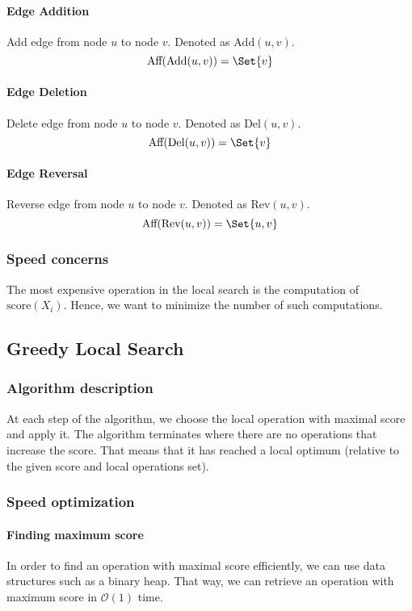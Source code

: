 \documentclass{article}
\newcommand{\score}[1]{
	\textrm{score}(#1)
}
\newcommand{\affnodes}[1]{
	\textrm{Aff}(#1)	
}
\newcommand{\addedge}[1]{
	\textrm{Add}(#1)	
}
\newcommand{\rmedge}[1]{
	\textrm{Del}(#1)
}
\newcommand{\revedge}[1]{
	\textrm{Rev}(#1)
}
\newcommand{\bigO}[1]{
	\mathcal{O}{(#1)}
}
\begin{document}
\paragraph{Edge Addition}
Add edge from node $u$ to node $v$. Denoted as $\addedge{u, v}$. $$ \affnodes{\addedge{u, v}} = \Set{v} $$
\paragraph{Edge Deletion}
Delete edge from node $u$ to node $v$. Denoted as $\rmedge{u, v}$. $$ \affnodes{\rmedge{u, v}} = \Set{v} $$
\paragraph{Edge Reversal}
Reverse edge from node $u$ to node $v$. Denoted as $\revedge{u, v}$. $$ \affnodes{\revedge{u, v}} = \Set{u, v} $$

\subsubsection{Speed concerns}
The most expensive operation in the local search is the computation of $\score{X_i}$. Hence, we want to minimize the number of such computations.

\subsection{Greedy Local Search}
\subsubsection{Algorithm description}
At each step of the algorithm, we choose the local operation with maximal score and apply it. The algorithm terminates where there are no operations that increase the score. That means that it has reached a local optimum (relative to the given score and local operations set).

\subsubsection{Speed optimization}
\paragraph{Finding maximum score} In order to find an operation with maximal score efficiently, we can use data structures such as a binary heap. That way, we can retrieve an operation with maximum score in $\bigO{1}$ time.
\end{document}
